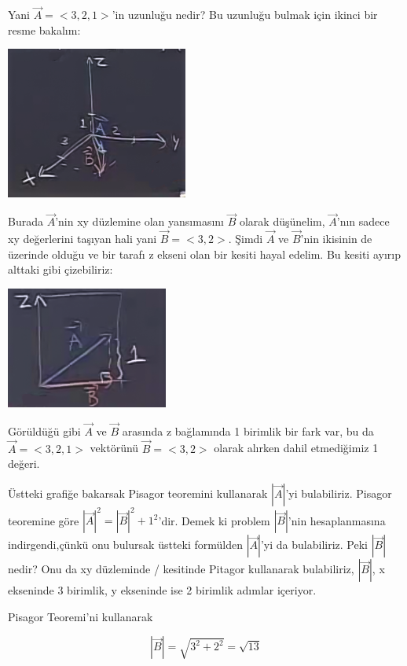 \documentclass[12pt,fleqn]{article}\usepackage{../../common}
\begin{document}
Yani $\vec{A} = <3,2,1>$'in uzunluğu nedir?  Bu uzunluğu bulmak için ikinci bir
resme bakalım:

\begin{center}
\includegraphics[height=5cm]{1_4.png}
\end{center}

Burada $\vec{A}$'nin xy düzlemine olan yansımasını $\vec{B}$ olarak düşünelim,
$\vec{A}$'nın sadece xy değerlerini taşıyan hali yani $\vec{B} = <3,2>$.  Şimdi
$\vec{A}$ ve $\vec{B}$'nin ikisinin de üzerinde olduğu ve bir tarafı z ekseni
olan bir kesiti hayal edelim. Bu kesiti ayırıp alttaki gibi çizebiliriz:

\begin{center}
\includegraphics[height=4cm]{1_5.png}
\end{center}

Görüldüğü gibi $\vec{A}$ ve $\vec{B}$ arasında z bağlamında 1 birimlik bir fark
var, bu da $\vec{A} = <3,2,1>$ vektörünü $\vec{B}=<3,2>$ olarak alırken dahil
etmediğimiz 1 değeri.

Üstteki grafiğe bakarsak Pisagor teoremini kullanarak $|\vec{A}|$'yi
bulabiliriz. Pisagor teoremine göre $|\vec{A}|^2 = |\vec{B}|^2 + 1^2$'dir. Demek
ki problem $|\vec{B}|$'nin hesaplanmasına indirgendi,çünkü onu bulursak üstteki
formülden $|\vec{A}|$'yi da bulabiliriz. Peki $|\vec{B}|$ nedir? Onu da xy
düzleminde / kesitinde Pitagor kullanarak bulabiliriz, $|\vec{B}|$, x ekseninde
3 birimlik, y ekseninde ise 2 birimlik adımlar içeriyor.

Pisagor Teoremi'ni kullanarak

$$  |\vec{B}| = \sqrt{3^2 + 2^2} = \sqrt{13} $$
\end{document}
